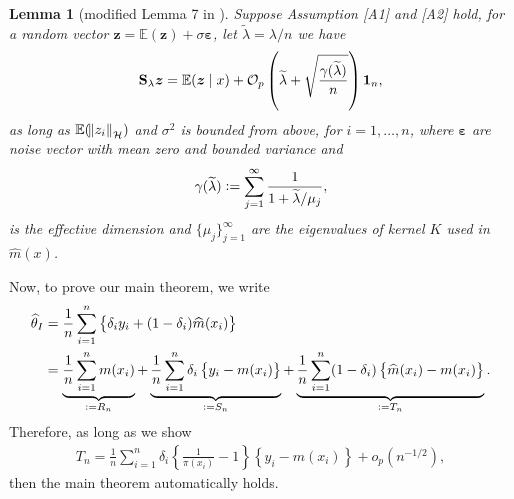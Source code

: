 \documentclass[12pt]{article}
\newtheorem{lemma}{Lemma}
\newcommand{\bx}{{x}}
\newcommand{\bz}{\bm{z}}
\newcommand{\bS}{\mathbf{S}}
\newcommand{\bone}{\mathbf{1}}
\newcommand{\bvar}{\boldsymbol{\varepsilon}}
\def\wh{\widehat}
\def\wt{\widetilde}
\begin{document}
\begin{lemma}[modified Lemma 7 in \citet{zhang2013divide}]\label{order}
Suppose Assumption [A1] and [A2] hold, for a random vector $\bz = \mathbb{E}(\bz) + \sigma \bvar$, let $\wt{\lambda} = \lambda/n$ we have
\begin{align}
 \bS_{\lambda}\bz = \mathbb{E}(\bz \mid \bx) + \mathcal{O}_{p}\left( \wt{\lambda} + \sqrt{\frac{ \gamma(\wt{\lambda})  }{n} } \right )\bone_{n},\notag
\end{align}
as long as $\mathbb{E}(\norm{z_{i}}_{\mathcal{H}})$ and $\sigma^{2}$ is bounded from above, for $i=1, \ldots, n$,  where $\bvar$ are noise vector with mean zero and bounded variance and 
 \begin{equation}\label{effective_dimension}
 \gamma(\wt{\lambda}) := \sum_{j=1}^{\infty} \frac{1}{1+\wt{\lambda}/\mu_{j}},\notag
 \end{equation}
is the effective dimension and $\{\mu_{j}\}_{j=1}^{\infty}$ are the eigenvalues of kernel $K$ used in $\hat{m}(\bx)$. 
\end{lemma}


Now, to prove our main theorem, we write 
\begin{align}
\wh{\theta}_{I} &= \frac{1}{n} \sum_{i=1}^{n}\left\{ \delta_{i}y_{i} + (1-\delta_{i}) \wh{m}(\bx_{i}) \right\} \notag \\
&= \underbrace{\frac{1}{n}\sum_{i=1}^{n}m(\bx_{i})}_{:= R_{n}} + \underbrace{\frac{1}{n}\sum_{i=1}^{n}\delta_{i}\left\{   y_{i}  - m(\bx_{i}) \right\}}_{:= S_{n} }  + \underbrace{\frac{1}{n}\sum_{i=1}^{n} (1-\delta_{i})\left\{ \wh{m}(\bx_{i}) - m(\bx_{i})  \right\}}_{:=T_{n}}.
\end{align}
Therefore, as long as we show 
\begin{align}
T_{n} = \frac{1}{n} \sum_{i=1}^{n}\delta_{i}\left\{ \frac{1}{\pi(\bx_{i})} - 1  \right\}\left\{ y_{i} - m(\bx_{i})  \right\} + o_{p}(n^{-1/2}),\label{12} 
\end{align}
then the main theorem automatically holds.
\end{document}

